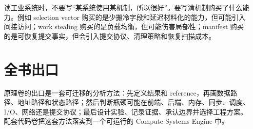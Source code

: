 读工业系统时，不要写“某系统使用某机制，所以很好”。要写清机制购买了什么能力。例如 selection vector 购买的是少搬冷字段和延迟材料化的能力，但可能引入间接访问；work stealing 购买的是负载均衡，但可能伤害局部性；manifest 购买的是可恢复提交事实，但会引入提交协议、清理策略和恢复扫描成本。

\section*{全书出口}

原理卷的出口是一套可迁移的分析方法：先定义结果和 reference，再画数据路径、地址路径和状态路径；然后判断瓶颈可能在前端、后端、内存、同步、调度、I/O、网络还是提交协议；最后设计实验、记录证据、承认边界并选择工程方案。配套代码卷把这套方法落实到一个可运行的 Compute Systems Engine 中。
